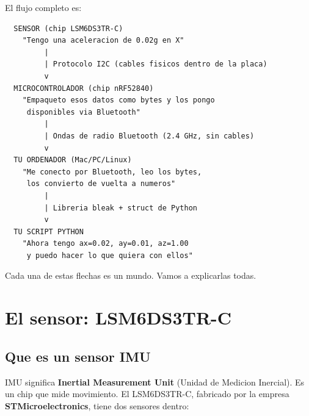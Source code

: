 \documentclass[11pt,a4paper]{article}
\begin{document}
El flujo completo es:

\begin{verbatim}
  SENSOR (chip LSM6DS3TR-C)
    "Tengo una aceleracion de 0.02g en X"
         |
         | Protocolo I2C (cables fisicos dentro de la placa)
         v
  MICROCONTROLADOR (chip nRF52840)
    "Empaqueto esos datos como bytes y los pongo
     disponibles via Bluetooth"
         |
         | Ondas de radio Bluetooth (2.4 GHz, sin cables)
         v
  TU ORDENADOR (Mac/PC/Linux)
    "Me conecto por Bluetooth, leo los bytes,
     los convierto de vuelta a numeros"
         |
         | Libreria bleak + struct de Python
         v
  TU SCRIPT PYTHON
    "Ahora tengo ax=0.02, ay=0.01, az=1.00
     y puedo hacer lo que quiera con ellos"
\end{verbatim}

Cada una de estas flechas es un mundo. Vamos a explicarlas todas.


\section{El sensor: LSM6DS3TR-C}

\subsection{Que es un sensor IMU}

IMU significa \textbf{Inertial Measurement Unit} (Unidad de Medicion
Inercial). Es un chip que mide movimiento. El LSM6DS3TR-C, fabricado
por la empresa \textbf{STMicroelectronics}, tiene dos sensores dentro:
\end{document}
